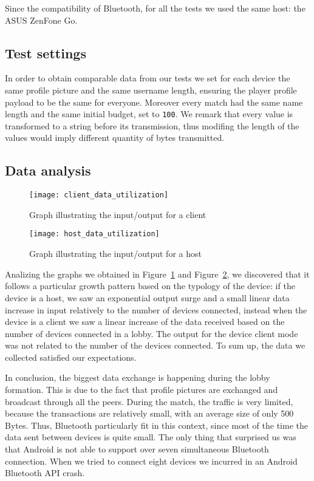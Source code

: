 Since the compatibility of Bluetooth, for all the tests we used the same host: 
the ASUS ZenFone Go.

\subsection{Test settings}

In order to obtain comparable data from our tests we set for each device 
the same profile picture and the same username length, ensuring the player 
profile payload to be the same for everyone. Moreover every match had the same 
name length and the same initial budget, set to \texttt{100}. We remark 
that every value is transformed to a string before its transmission, thus
modifing the length of the values would imply different quantity of bytes 
transmitted.

\subsection{Data analysis}
\begin{figure}[t]
 \centering
 \texttt{[image: client\_data\_utilization]}
 \caption{Graph illustrating the input/output for a client}
 \label{fig:res:cdu}
\end{figure}

\begin{figure}[t]
 \centering
 \texttt{[image: host\_data\_utilization]}
 \caption{Graph illustrating the input/output for a host}
 \label{fig:res:hdu}
\end{figure}

Analizing the graphs we obtained in Figure~\ref{fig:res:cdu} and 
Figure~\ref{fig:res:hdu}, we discovered that it follows a particular growth 
pattern based on the typology of the device: if the device is a host, we saw an 
exponential output surge and a small linear data increase in input relatively 
to the number of devices connected, instead when the device is a client we saw a 
linear increase of the data received based on the number of devices connected in 
a lobby. The output for the device client mode was not related to the number of 
the devices connected. To sum up, the data we collected satisfied our 
expectations.

In conclusion, the biggest data exchange is happening during the lobby 
formation. This is due to the fact that profile pictures are exchanged and 
broadcast through all the peers. During the match, the traffic is very limited, 
because the transactions are relatively small, with an average size of only 500 
Bytes. Thus, Bluetooth particularly fit in this context, since most of the time 
the data sent between devices is quite small.
The only thing that surprised us was that Android is not able to support over 
seven simultaneous Bluetooth connection. When we tried to connect eight devices 
we incurred in an Android Bluetooth API crash.

